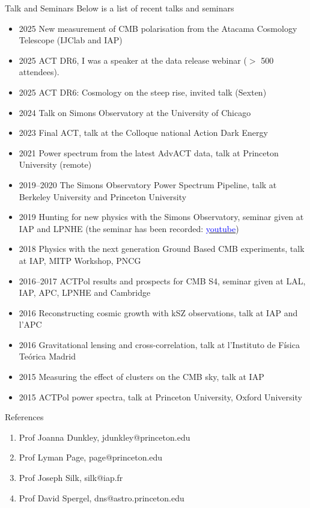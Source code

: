 \documentclass{resume} %
\newcommand{\TIB}[1]{\textcolor{blue}{#1}}
\begin{document}
\begin{rSection}{Talk and Seminars }
Below is a list of recent talks and seminars 
\begin{itemize}
\item  2025  New measurement of CMB polarisation from the Atacama Cosmology Telescope (IJClab and IAP) 
\item  2025  ACT DR6, I was a speaker at the data release webinar ($>$ 500 attendees).  
\item  2025  ACT DR6: Cosmology on the steep rise, invited talk (Sexten)  
\item  2024  Talk on Simons Observatory at the University of Chicago 
\item  2023  Final ACT, talk at the Colloque national Action Dark Energy 
\item  2021  Power spectrum from the latest AdvACT data, talk at Princeton University (remote) 
\item  2019--2020  The Simons Observatory Power Spectrum Pipeline, talk at Berkeley University and Princeton University 
\item  2019  Hunting for new physics with the Simons Observatory, seminar given at  IAP and  LPNHE (the seminar has been recorded: \href{https://www.youtube.com/watch?v=1XnZhEU1WgE}{\TIB{youtube}})  
\item  2018  Physics with the next generation Ground Based CMB experiments, talk at IAP, MITP Workshop, PNCG 
\item  2016--2017  ACTPol results and prospects for CMB S4, seminar given at LAL, IAP, APC,  LPNHE and Cambridge
\item  2016  Reconstructing cosmic growth with kSZ observations, talk at IAP and l'APC 
\item  2016  Gravitational lensing and cross-correlation, talk at l'Instituto de Física Teórica Madrid 
\item  2015  Measuring the effect of clusters on the CMB sky, talk at IAP 
\item  2015  ACTPol power spectra, talk at Princeton University, Oxford University
\end{itemize}

\end{rSection}


\begin{rSection}{References }

\begin{enumerate}
\item Prof Joanna Dunkley, jdunkley@princeton.edu
\item Prof Lyman Page, page@princeton.edu
\item Prof Joseph Silk, silk@iap.fr
\item Prof David Spergel, dns@astro.princeton.edu
\end{enumerate}

\end{rSection}
\end{document}
